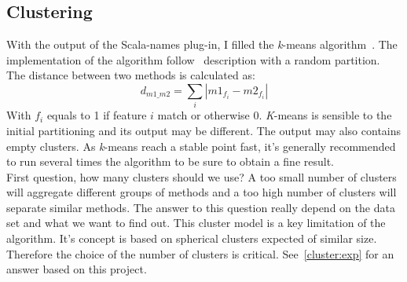 \documentclass[12pt]{article}
\begin{document}
\subsection{Clustering}
\label{cluster}
With the output of the Scala-names plug-in, I filled the \textit{k}-means algorithm~\cite{kMeans}. %
The implementation of the algorithm follow~\cite{kMeans} description with a random partition. The distance between two methods is calculated as:
\begin{equation}
d_{m1\_m2} = \sum_i{ |m1_{f_i}-m2_{f_i}|}
\end{equation}
With $f_i$ equals to 1 if feature $i$ match or otherwise 0. \textit{K}-means is sensible to the initial partitioning and its output may be different. The output may also contains empty clusters. As \textit{k}-means reach a stable point fast, it's generally recommended to run several times the algorithm to be sure to obtain a fine result.\\

First question, how many clusters should we use? A too small number of clusters will aggregate different groups of methods and a too high number of clusters will separate similar methods. The answer to this question really depend on the data set and what we want to find out. This cluster model is a key limitation of the algorithm. It's concept is based on spherical clusters expected of similar size. Therefore the choice of the number of clusters is critical. See~\ref{cluster:exp} for an answer based on this project.\\
\end{document}

